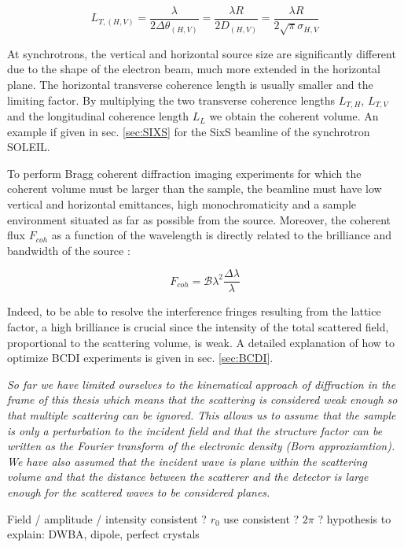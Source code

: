 \begin{equation}
    \label{eq:TransverseCoL}
    L_{T,(H, V)} = \frac{\lambda}{2\Delta\theta_{(H, V)}} = \frac{\lambda R}{2 D_{(H, V)}} = \frac{\lambda R}{2\sqrt{\pi}\sigma_{H, V}}
\end{equation}

At synchrotrons, the vertical and horizontal source size are significantly different due to the shape of the electron beam, much more extended in the horizontal plane.
The horizontal transverse coherence length is usually smaller and the limiting factor.
By multiplying the two transverse coherence lengths $L_{T,H}$, $L_{T,V}$ and the longitudinal coherence length $L_L$ we obtain the coherent volume.
An example if given in sec. \ref{sec:SIXS} for the SixS beamline of the synchrotron SOLEIL.

To perform Bragg coherent diffraction imaging experiments for which the coherent volume must be larger than the sample, the beamline must have low vertical and horizontal emittances, high monochromaticity and a sample environment situated as far as possible from the source.
Moreover, the coherent flux $F_{coh}$ as a function of the wavelength is directly related to the brilliance and bandwidth of the source \parencite{Willmott}:

\begin{equation}
    \label{eq:CoherentFlux}
    F_{coh} = \mathcal{B} \lambda^2 \frac{\Delta \lambda}{\lambda}
\end{equation}

Indeed, to be able to resolve the interference fringes resulting from the lattice factor, a high brilliance is crucial since the intensity of the total scattered field, proportional to the scattering volume, is weak.
A detailed explanation of how to optimize BCDI experiments is given in sec. \ref{sec:BCDI}.

\textit{
So far we have limited ourselves to the kinematical approach of diffraction in the frame of this thesis which means that the scattering is considered weak enough so that multiple scattering can be ignored.
This allows us to assume that the sample is only a perturbation to the incident field and that the structure factor can be written as the Fourier transform of the electronic density (Born approxiamtion).
We have also assumed that the incident wave is plane within the scattering volume and that the distance between the scatterer and the detector is large enough for the scattered waves to be considered planes.
}

\textcolor{Important}{
Field / amplitude / intensity consistent ?
$r_0$ use consistent ? $2\pi$ ?
hypothesis to explain: DWBA, dipole, perfect crystals
}
